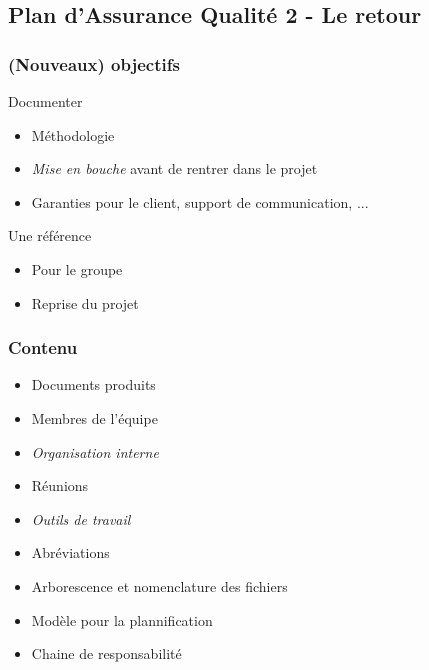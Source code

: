 \subsection{Plan d'Assurance Qualité 2 - Le retour}

\begin{frame}
\tableofcontents[subsectionstyle=show/shaded/hide, subsubsectionstyle=hide, sectionstyle=show/hide]
\end{frame}

\begin{frame}
\frametitle{(Nouveaux) objectifs}
\begin{block}{Documenter}
\begin{itemize}
    \item Méthodologie %
    \item \emph{Mise en bouche} avant de rentrer dans le projet %
    \item Garanties pour le client, support de communication, ...
\end{itemize}
\end{block}
\begin{block}{Une référence}
\begin{itemize}
    \item Pour le groupe %
    \item Reprise du projet %
\end{itemize}
\end{block}
\end{frame} %

\begin{frame}
\frametitle{Contenu}
\begin{itemize}
    \item Documents produits
    \item Membres de l'équipe
    \item \emph{Organisation interne}
    \item Réunions
    \item \emph{Outils de travail}
    \item Abréviations
    \item Arborescence et nomenclature des fichiers
    \item Modèle pour la plannification
    \item Chaine de responsabilité
\end{itemize}
\end{frame} %

